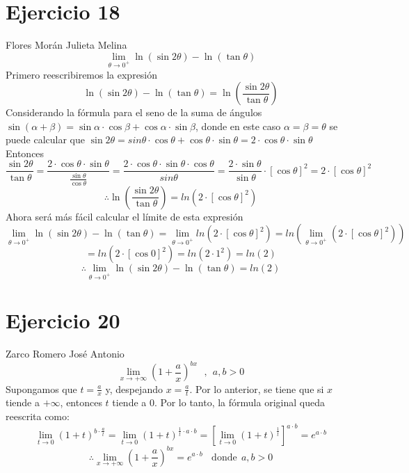\documentclass[12pt]{article}
\begin{document}
\section{Ejercicio 18}
Flores Morán Julieta Melina \\
\[
\lim_{\theta \to 0^+} \ln (\sin 2\theta) - \ln (\tan \theta)
\]
Primero reescribiremos la expresión
\[
 \ln (\sin 2\theta) - \ln (\tan \theta) = \ln ( \frac{\sin 2\theta}{\tan \theta} ) 
\]
Considerando la fórmula para el seno de la suma de ángulos $ \sin (\alpha + \beta) = \sin \alpha \cdot \cos \beta + \cos \alpha \cdot \sin \beta $, donde en este caso $\alpha = \beta = \theta$ se puede calcular que $\sin 2\theta = sin \theta \cdot \cos \theta  + \cos \theta  \cdot \sin \theta   = 2 \cdot \cos \theta  \cdot \sin \theta $ \\
Entonces 
\[
 \frac{\sin 2\theta}{\tan \theta} = \frac{ 2 \cdot \cos \theta  \cdot \sin \theta}{\frac{\sin \theta}{\cos \theta}} = \frac{2 \cdot \cos \theta  \cdot \sin \theta \cdot \cos \theta}{sin \theta} = \frac{2 \cdot \sin \theta}{\sin \theta} \cdot [\cos \theta]^{2} = 2 \cdot [\cos \theta]^{2}
\]
\[
\therefore \ln ( \frac{ \sin 2 \theta }{ \tan \theta} ) = ln ( 2 \cdot [\cos \theta]^{2} )
\]
Ahora será más fácil calcular el límite de esta expresión
\[
\lim_{\theta \to 0^+} \ln (\sin 2\theta) - \ln (\tan \theta) = \lim_{\theta \to 0^+}  ln ( 2 \cdot [\cos \theta]^{2} ) =  ln ( \lim_{\theta \to 0^+} ( 2 \cdot [\cos \theta]^{2} )) 
\]
\[
= ln (  2 \cdot [\cos 0]^{2}) =ln (  2 \cdot 1^{2})  = ln (2) 
\]
\[
\therefore \lim_{\theta \to 0^+} \ln (\sin 2\theta) - \ln (\tan \theta) =  ln (2) 
\]
\section{Ejercicio 20}
Zarco Romero José Antonio\\
\[
\lim_{x \to + \infty} (1+\frac{a}{x})^{bx} ~ ~ ~,~ ~ a,b>0
\]
Supongamos que $t=\frac{a}{x}$ y, despejando $x=\frac{a}{t}$. Por lo anterior, se tiene que si $x$ tiende a $+ \infty$, entonces $t$ tiende a $0$. Por lo tanto, la fórmula original queda reescrita como:
\[
\lim_{t \to 0} (1+t)^{b \cdot \frac{a}{t}}
= \lim_{t \to 0} (1+t)^{\frac{1}{t} \cdot a \cdot b}
= [\lim_{t \to 0} (1+t)^{\frac{1}{t}}]^{a \cdot b}
= e^{a \cdot b}
\]
\[
\therefore \lim_{x \to + \infty} (1+\frac{a}{x})^{bx}
= e^{a \cdot b}
 ~ ~ ~ ~\text{donde}~ ~ a,b>0
\]

\end{document}
